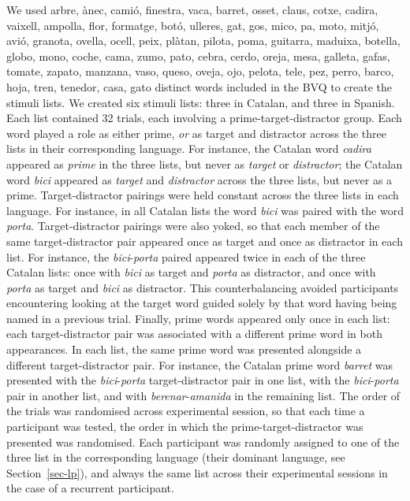 \documentclass[
  letterpaper,
  DIV=11,
  numbers=noendperiod]{scrartcl}
\begin{document}
We used arbre, ànec, camió, finestra, vaca, barret, osset, claus, cotxe,
cadira, vaixell, ampolla, flor, formatge, botó, ulleres, gat, gos, mico,
pa, moto, mitjó, avió, granota, ovella, ocell, peix, plàtan, pilota,
poma, guitarra, maduixa, botella, globo, mono, coche, cama, zumo, pato,
cebra, cerdo, oreja, mesa, galleta, gafas, tomate, zapato, manzana,
vaso, queso, oveja, ojo, pelota, tele, pez, perro, barco, hoja, tren,
tenedor, casa, gato distinct words included in the BVQ to create the
stimuli lists. We created six stimuli lists: three in Catalan, and three
in Spanish. Each list contained 32 trials, each involving a
prime-target-distractor group. Each word played a role as either prime,
\emph{or} as target and distractor across the three lists in their
corresponding language. For instance, the Catalan word \emph{cadira}
appeared as \emph{prime} in the three lists, but never as \emph{target}
or \emph{distractor}; the Catalan word \emph{bici} appeared as
\emph{target} and \emph{distractor} across the three lists, but never as
a prime. Target-distractor pairings were held constant across the three
lists in each language. For instance, in all Catalan lists the word
\emph{bici} was paired with the word \emph{porta}. Target-distractor
pairings were also yoked, so that each member of the same
target-distractor pair appeared once as target and once as distractor in
each list. For instance, the \emph{bici}-\emph{porta} paired appeared
twice in each of the three Catalan lists: once with \emph{bici} as
target and \emph{porta} as distractor, and once with \emph{porta} as
target and \emph{bici} as distractor. This counterbalancing avoided
participants encountering looking at the target word guided solely by
that word having being named in a previous trial. Finally, prime words
appeared only once in each list: each target-distractor pair was
associated with a different prime word in both appearances. In each
list, the same prime word was presented alongside a different
target-distractor pair. For instance, the Catalan prime word
\emph{barret} was presented with the \emph{bici}-\emph{porta}
target-distractor pair in one list, with the \emph{bici}-\emph{porta}
pair in another list, and with \emph{berenar}-\emph{amanida} in the
remaining list. The order of the trials was randomised across
experimental session, so that each time a participant was tested, the
order in which the prime-target-distractor was presented was randomised.
Each participant was randomly assigned to one of the three list in the
corresponding language (their dominant language, see
Section~\ref{sec-lp}), and always the same list across their
experimental sessions in the case of a recurrent participant.
\end{document}
